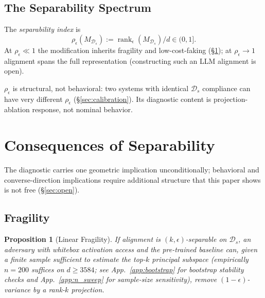 \documentclass[10pt]{article}
\newtheorem{proposition}[theorem]{Proposition}
\theoremstyle{definition}
\theoremstyle{remark}
\begin{document}
\subsection{The Separability Spectrum}
\label{sec:nature}

The \emph{separability index} is
\begin{equation}
  \rho_{\epsilon}(M_{\mathcal{D}_s})
  := \operatorname{rank}_{\epsilon}(M_{\mathcal{D}_s}) / d
  \in (0, 1].
  \label{eq:sep_index}
\end{equation}
At $\rho_{\epsilon} \ll 1$ the modification inherits
fragility and low-cost-faking (\S\ref{sec:consequences});
at $\rho_{\epsilon} \to 1$ alignment spans the full
representation (constructing such an LLM alignment
is open).

$\rho_{\epsilon}$ is structural, not behavioral: two
systems with identical $\mathcal{D}_s$ compliance can
have very different $\rho_{\epsilon}$
(\S\ref{sec:calibration}).  Its diagnostic content is
projection-ablation response, not nominal behavior.


\section{Consequences of Separability}
\label{sec:consequences}

The diagnostic carries one geometric implication
unconditionally; behavioral and converse-direction
implications require additional structure that this
paper shows is not free (\S\ref{sec:open}).

\subsection{Fragility}
\label{sec:fragility}

\begin{proposition}[Linear Fragility]
\label{prop:fragility}
If alignment is $(k,\epsilon)$-separable on $\mathcal{D}_s$,
an adversary with whitebox activation access and the
pre-trained baseline can, given a finite sample
sufficient to estimate the top-$k$ principal subspace
(empirically $n{=}200$ suffices on $d{\geq}3584$;
see App.~\ref{app:bootstrap} for bootstrap stability checks and
App.~\ref{app:n_sweep} for sample-size sensitivity),
remove $(1-\epsilon)$-variance by a rank-$k$ projection.
\end{proposition}
\end{document}
